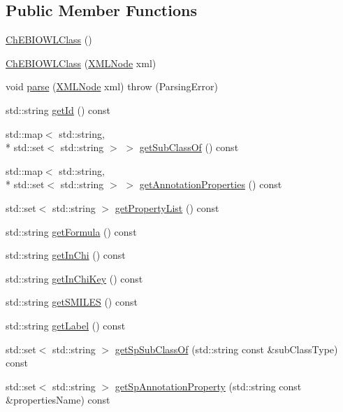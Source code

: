 \subsection*{Public Member Functions}
\begin{DoxyCompactItemize}
\item 
\hyperlink{classunisys_1_1ChEBIOWLClass_a2399546f521a8944c9d2d684d34cffbb}{Ch\-E\-B\-I\-O\-W\-L\-Class} ()
\item 
\hyperlink{classunisys_1_1ChEBIOWLClass_a286dbb327267e654ac903076ace09ebf}{Ch\-E\-B\-I\-O\-W\-L\-Class} (\hyperlink{structXMLNode}{X\-M\-L\-Node} xml)
\item 
void \hyperlink{classunisys_1_1ChEBIOWLClass_a923d1d7e6c6db3cf16f6fa0d361354e6}{parse} (\hyperlink{structXMLNode}{X\-M\-L\-Node} xml)  throw (\-Parsing\-Error)
\item 
std\-::string \hyperlink{classunisys_1_1ChEBIOWLClass_a065642342c1d6128eed047eb0ac2cc86}{get\-Id} () const 
\item 
std\-::map$<$ std\-::string, \\*
std\-::set$<$ std\-::string $>$ $>$ \hyperlink{classunisys_1_1ChEBIOWLClass_aee6d27a23c8d37f32e615c092b21bc6f}{get\-Sub\-Class\-Of} () const 
\item 
std\-::map$<$ std\-::string, \\*
std\-::set$<$ std\-::string $>$ $>$ \hyperlink{classunisys_1_1ChEBIOWLClass_a4f26e034a7e67b315b849214d339d518}{get\-Annotation\-Properties} () const 
\item 
std\-::set$<$ std\-::string $>$ \hyperlink{classunisys_1_1ChEBIOWLClass_af58a3d6397491f2ca151ddde60fc87b3}{get\-Property\-List} () const 
\item 
std\-::string \hyperlink{classunisys_1_1ChEBIOWLClass_aca905897ba7ec051f58d8678c0212443}{get\-Formula} () const 
\item 
std\-::string \hyperlink{classunisys_1_1ChEBIOWLClass_a99a66fa3cfd603164048154e6c69d81a}{get\-In\-Chi} () const 
\item 
std\-::string \hyperlink{classunisys_1_1ChEBIOWLClass_acaae86d1b5cf33a684d7ffbdc0bd32d8}{get\-In\-Chi\-Key} () const 
\item 
std\-::string \hyperlink{classunisys_1_1ChEBIOWLClass_a43fe054e370a5d6e451c85826b089eb1}{get\-S\-M\-I\-L\-E\-S} () const 
\item 
std\-::string \hyperlink{classunisys_1_1ChEBIOWLClass_a50cb32b74994a3a8313bd3a8ed1f0f6d}{get\-Label} () const 
\item 
std\-::set$<$ std\-::string $>$ \hyperlink{classunisys_1_1ChEBIOWLClass_af0bcc628140659b151e773eba2a9c1fb}{get\-Sp\-Sub\-Class\-Of} (std\-::string const \&sub\-Class\-Type) const 
\item 
std\-::set$<$ std\-::string $>$ \hyperlink{classunisys_1_1ChEBIOWLClass_a7673a9020ac603b41004bcb4a743d568}{get\-Sp\-Annotation\-Property} (std\-::string const \&properties\-Name) const 
\end{DoxyCompactItemize}
